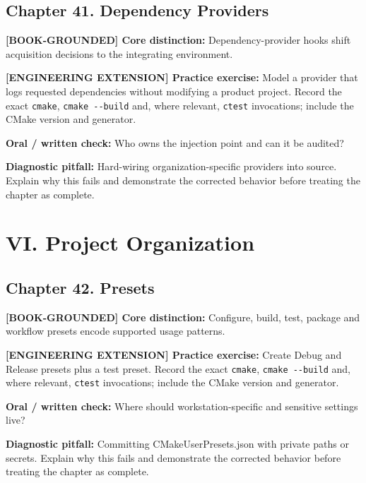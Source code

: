 \documentclass[11pt,letterpaper,oneside]{report}
\providecommand{\passthrough}[1]{#1}
\begin{document}
\section{Chapter 41. Dependency
Providers}\label{chapter-41.-dependency-providers}

\textbf{{[}BOOK-GROUNDED{]} Core distinction:} Dependency-provider hooks
shift acquisition decisions to the integrating environment.

\textbf{{[}ENGINEERING EXTENSION{]} Practice exercise:} Model a provider
that logs requested dependencies without modifying a product project.
Record the exact \passthrough{\lstinline!cmake!},
\passthrough{\lstinline!cmake --build!} and, where relevant,
\passthrough{\lstinline!ctest!} invocations; include the CMake version
and generator.

\textbf{Oral / written check:} Who owns the injection point and can it
be audited?

\textbf{Diagnostic pitfall:} Hard-wiring organization-specific providers
into source. Explain why this fails and demonstrate the corrected
behavior before treating the chapter as complete.

\chapter{VI. Project Organization}\label{vi.-project-organization}

\section{Chapter 42. Presets}\label{chapter-42.-presets}

\textbf{{[}BOOK-GROUNDED{]} Core distinction:} Configure, build, test,
package and workflow presets encode supported usage patterns.

\textbf{{[}ENGINEERING EXTENSION{]} Practice exercise:} Create Debug and
Release presets plus a test preset. Record the exact
\passthrough{\lstinline!cmake!}, \passthrough{\lstinline!cmake --build!}
and, where relevant, \passthrough{\lstinline!ctest!} invocations;
include the CMake version and generator.

\textbf{Oral / written check:} Where should workstation-specific and
sensitive settings live?

\textbf{Diagnostic pitfall:} Committing CMakeUserPresets.json with
private paths or secrets. Explain why this fails and demonstrate the
corrected behavior before treating the chapter as complete.
\end{document}
